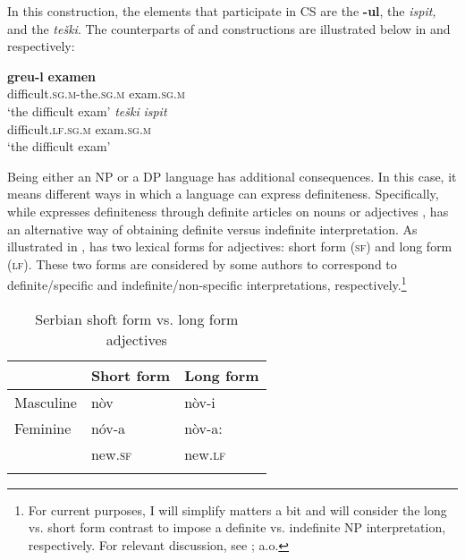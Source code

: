 \documentclass[output=paper,hidelinks,newtxmath,]{langscibook}
\begin{document}
\noindent In this construction, the elements that participate in CS are the   \textbf{-ul}, the   \textit{ispit,} and the   \textit{teški}. The counterparts of  and  constructions are illustrated below in  and  respectively:

\ea \label{15:ex11}
	\ea\label{15:ex11a}
    \gll \textbf{greu-l} \textbf{examen}\\          
        difficult\textsc{.sg.m}-the\textsc{.sg.m} exam\textsc{.sg.m}\\
        \glt `the difficult exam'
	\ex\label{15:ex11b}
    \gll \textit{teški} \textit{ispit}\\
         difficult\textsc{.lf.sg.m} exam\textsc{.sg.m}\\ 
         \glt `the difficult exam'
	\z
\z

\noindent Being either an NP or a DP language has additional consequences. In this case, it means different ways in which a language can express definiteness. Specifically, while  expresses definiteness through definite articles on nouns  or adjectives ,  has an alternative way of obtaining definite versus indefinite interpretation. As illustrated in ,  has two lexical forms for adjectives: short form (\textsc{sf}) and long form (\textsc{lf}). These two forms are considered by some authors \citep{Aljovic2002,Despic2011,Talic2014} to correspond to definite/specific  and indefinite/non-specific  interpretations, respectively.\footnote{\label{15:fn6}For current purposes, I will simplify matters a bit and will consider the long vs. short form contrast to impose a definite vs. indefinite NP interpretation, respectively. For relevant discussion, see \citet{Aljovic2002,Despic2011,Talic2014,Stankovic2015}; a.o.}

\begin{table}
    \centering
\begin{tabularx}{0.6\textwidth}{lXX}
  \lsptoprule
  & \textbf{Short form}&\textbf{Long form}\\\midrule
  Masculine & nòv & nòv-i\\
  Feminine & nóv-a & nòv-a:\\
  & new.\textsc{sf} & new.\textsc{lf}\\
  \lspbottomrule
\end{tabularx}
  \caption{Serbian shoft form vs. long form adjectives}\label{15:t1}
\end{table}
\end{document}
